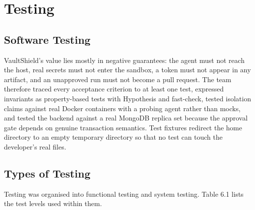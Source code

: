\documentclass[12pt,a4paper,oneside]{report}
\begin{document}
\chapter{Testing}\label{software-testing}

\section{Software Testing}\label{software-testing-1}

VaultShield's value lies mostly in negative guarantees: the agent must not reach the host, real secrets must not enter the sandbox, a token must not appear in any artifact, and an unapproved run must not become a pull request. The team therefore traced every acceptance criterion to at least one test, expressed invariants as property-based tests with Hypothesis and fast-check, tested isolation claims against real Docker containers with a probing agent rather than mocks, and tested the backend against a real MongoDB replica set because the approval gate depends on genuine transaction semantics. Test fixtures redirect the home directory to an empty temporary directory so that no test can touch the developer's real files.

\section{Types of Testing}\label{types-of-testing}

Testing was organised into functional testing and system testing. Table 6.1 lists the test levels used within them.
\end{document}
